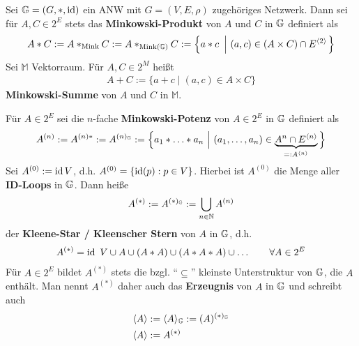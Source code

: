 \begin{proposition}\enter
    Sei $\mathbb{G}=(G,\ast,\operatorname{id})$ ein ANW mit $G=(V,E,\rho)$ zugehöriges Netzwerk. Dann sei für $A,C\in 2^E$ stets das \textbf{Minkowski-Produkt} von $A$ und $C$ in $\mathbb{G}$ definiert als
    \begin{align*}
        A\ast C
        :=A\ast_{\text{Mink}} C
        :=A\ast_{\text{Mink}(\mathbb{G})} C
        :=\left\lbrace a\ast c~\left|~(a,c)\in (A\times C)\cap E^{\langle2\rangle}\right.\right\rbrace
    \end{align*}
    Sei $\mathbb{M}$ Vektorraum. Für $A,C\in 2^M$ heißt
    \begin{align*}
        A+C:=\big\lbrace a+c\mid (a,c)\in A\times C\big\rbrace
    \end{align*}
    \textbf{Minkowski-Summe} von $A$ und $C$ in $\mathbb{M}$.

    Für $A\in 2^E$ sei die $n$-fache \textbf{Minkowski-Potenz} von $A\in 2^E$ in $\mathbb{G}$ definiert als
    \begin{align*}
        A^{(n)}
        := A^{(n)\ast}
        := A^{(n)_{\mathbb{G}}}
        :=\Big\lbrace a_1\ast\ldots\ast a_n~\Big|~(a_1,\ldots,a_n)\in \underbrace{A^n\cap E^{\langle n\rangle}}_{=:A^{\langle n\rangle}}\Big\rbrace
    \end{align*}
    Sei $A^{(0)}:=\operatorname{id} V$, d.h. $A^{(0)}=\lbrace\operatorname{id}(p):p\in V\rbrace$. Hierbei ist $A^{(0)}$ die Menge aller \textbf{ID-Loops} in $\mathbb{G}$.
    Dann heiße
    \begin{align*}
        A^{(\ast)}:=A^{(\ast)_{\mathbb{G}}}:=\bigcup\limits_{n\in\mathbb{N}} A^{(n)}
    \end{align*}
    der \textbf{Kleene-Star / Kleenscher Stern} von $A$ in $\mathbb{G}$, d.h.
    \begin{align*}
        A^{(\ast)}=\operatorname{id}~V\cup A\cup (A\ast A)\cup (A\ast A\ast A)\cup\ldots\qquad\forall A\in 2^E
    \end{align*}
    Für $A\in 2^E$ bildet $A^{(\ast)}$ stets die bzgl. ``$\subseteq$'' kleinste Unterstruktur von $\mathbb{G}$, die $A$ enthält. Man nennt $A^{(\ast)}$ daher auch das \textbf{Erzeugnis} von $A$ in $\mathbb{G}$ und schreibt auch
    \begin{align*}
        \langle A\rangle &:=\langle A\rangle_{\mathbb{G}}:=(A)^{(\ast)_{\mathbb{G}}}\\
        \langle A\rangle&:=A^{(\ast)}
    \end{align*}
\end{proposition}

